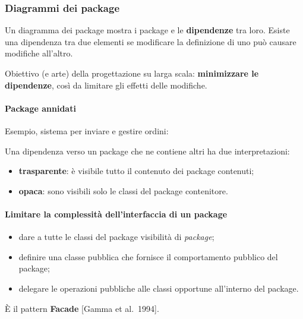 \documentclass[a4paper,12pt]{article}
\begin{document}
\subsubsection{Diagrammi dei package}
Un diagramma dei package mostra i package e le \textbf{dipendenze} tra loro. Esiste una
dipendenza tra due elementi se modificare la definizione di uno può causare modifiche
all'altro.

Obiettivo (e arte) della progettazione su larga scala: \textbf{minimizzare le
dipendenze}, così da limitare gli effetti delle modifiche.

\paragraph{Package annidati}
Esempio, sistema per inviare e gestire ordini:
\begin{center}
\end{center}
Una dipendenza verso un package che ne contiene altri ha due interpretazioni:
\begin{itemize}
  \item \textbf{trasparente}: è visibile tutto il contenuto dei package contenuti;
  \item \textbf{opaca}: sono visibili solo le classi del package contenitore.
\end{itemize}

\paragraph{Limitare la complessità dell'interfaccia di un package}
\begin{itemize}
  \item dare a tutte le classi del package visibilità di \emph{package};
  \item definire una classe pubblica che fornisce il comportamento pubblico del package;
  \item delegare le operazioni pubbliche alle classi opportune all'interno del package.
\end{itemize}
È il pattern \textbf{Facade} [Gamma et al.\ 1994].
\end{document}
